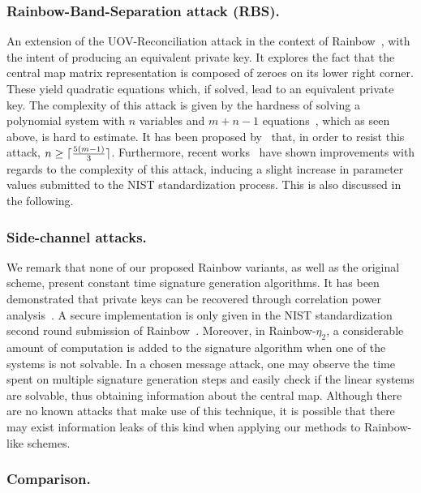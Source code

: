 \documentclass[12pt, a4paper, oneside]{memoir}
\DeclarePairedDelimiter{\ceil}{\lceil}{\rceil}
\theoremstyle{definition}
\begin{document}
\subsubsection{Rainbow-Band-Separation attack (RBS).}

An extension of the UOV-Reconciliation attack in the context of Rainbow~\cite{Ding:200806}, with the intent of producing an equivalent private key. It explores the fact that the central map matrix representation is composed of zeroes on its lower right corner. These yield quadratic equations which, if solved, lead to an equivalent private key. The complexity of this attack is given by the hardness of solving a polynomial system with $n$ variables and $m + n - 1$ equations~\cite[Theorem 3.30]{Thomae:201306}, which as seen above, is hard to estimate. It has been proposed by~\cite{Petzoldt:201005} that, in order to resist this attack, $n \geq \ceil{\frac{5 (m - 1)}{3}}$. Furthermore, recent works~\cite{Perlner:202006,Nakamura:202007a} have shown improvements with regards to the complexity of this attack, inducing a slight increase in parameter values submitted to the NIST standardization process. This is also discussed in the following.

\subsubsection{Side-channel attacks.} 

We remark that none of our proposed Rainbow variants, as well as the original scheme, present constant time signature generation algorithms. It has been demonstrated that private keys can be recovered through correlation power analysis~\cite{Park:201808}. A secure implementation is only given in the NIST standardization second round submission of Rainbow~\cite{Ding:201901}. Moreover, in Rainbow-$\eta_2$, a considerable amount of computation is added to the signature algorithm when one of the systems is not solvable. In a chosen message attack, one may observe the time spent on multiple signature generation steps and easily check if the linear systems are solvable, thus obtaining information about the central map. Although there are no known attacks that make use of this technique, it is possible that there may exist information leaks of this kind when applying our methods to Rainbow-like schemes.

\subsubsection{Comparison.}
\end{document}
